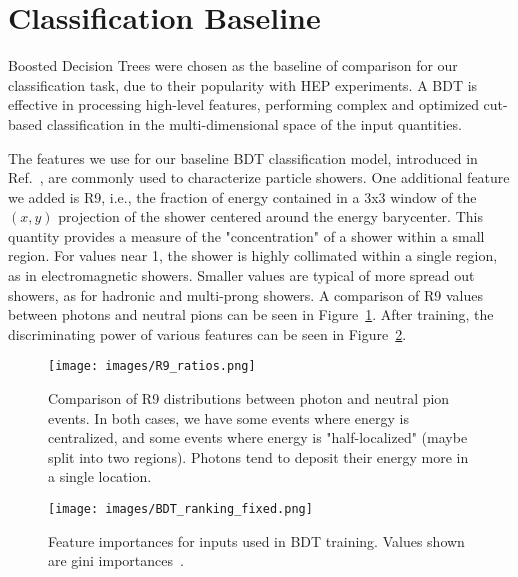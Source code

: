 \section{Classification Baseline}\label{app:BDT}

Boosted Decision Trees were chosen as the baseline of comparison for our classification task, due to their popularity with HEP experiments. A BDT is effective in processing high-level features, performing complex and optimized cut-based classification in the multi-dimensional space of the input quantities. 


The features we use for our baseline BDT classification model, introduced in Ref.~\cite{NIPS}, are commonly used to characterize particle showers. One additional feature we added is R9, i.e., the fraction of energy contained in a 3x3 window of the $(x,y)$ projection of the shower centered around the energy barycenter. This quantity provides a measure of the "concentration" of a shower within a small region. For values near 1, the shower is highly collimated within a single region, as in electromagnetic showers. Smaller values are typical of more spread out showers, as for hadronic and multi-prong showers. A comparison of R9 values between photons and neutral pions can be seen in Figure~\ref{fig:R9}. After training, the discriminating power of various features can be seen in Figure~\ref{fig:BDT_ranking}.

\begin{figure}[htbp]
\centering
\texttt{[image: images/R9\_ratios.png]}
\caption{Comparison of R9 distributions between photon and neutral pion events. In both cases, we have some events where energy is centralized, and some events where energy is "half-localized" (maybe split into two regions). Photons tend to deposit their energy more in a single location.
\label{fig:R9}}
\end{figure}

\begin{figure}[htbp]
\centering
\texttt{[image: images/BDT\_ranking\_fixed.png]}
\caption{Feature importances for inputs used in BDT training. Values shown are gini importances~\cite{Breiman}.\label{fig:BDT_ranking}}
\end{figure}